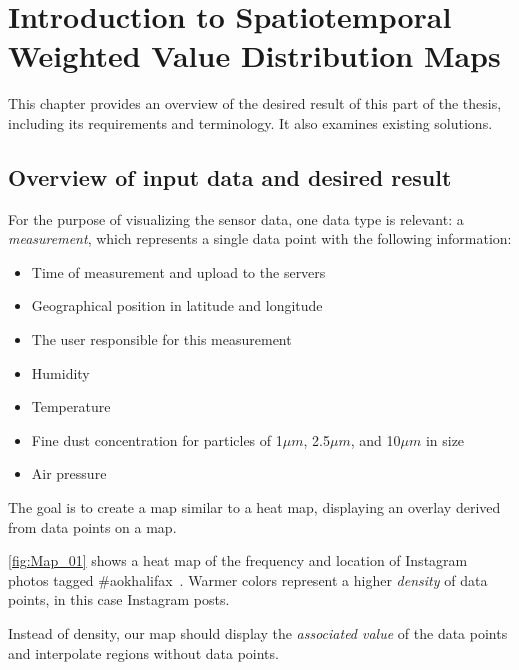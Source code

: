 \chapter{Introduction to Spatiotemporal Weighted Value Distribution Maps}\label{chap:christian-introduction}

This chapter provides an overview of the desired result of this part of the thesis, including its requirements and terminology. It also examines existing solutions.

\section{Overview of input data and desired result}

For the purpose of visualizing the sensor data, one data type is relevant: a \emph{measurement}, which represents a single data point with the following information:
\begin{itemize}
    \item Time of measurement and upload to the servers
    \item Geographical position in latitude and longitude
    \item The user responsible for this measurement
    \item Humidity
    \item Temperature
    \item Fine dust concentration for particles of 1$\mu m$, 2.5$\mu m$, and 10$\mu m$ in size
    \item Air pressure
\end{itemize}

The goal is to create a map similar to a heat map, displaying an overlay
derived from data points on a map.


\autoref{fig:Map_01} shows a heat map of the frequency and location of
Instagram photos tagged \#aokhalifax~\cite{heatmap:01}. Warmer colors represent
a higher \emph{density} of data points, in this case Instagram posts.

Instead of density, our map should display the \emph{associated value} of the data points and interpolate
regions without data points.



